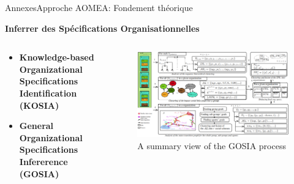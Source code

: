 \begin{frame}[allowframebreaks]{Annexes}{Approche AOMEA: Fondement théorique}

    \textbf{Inferrer des Spécifications Organisationnelles}

    \begin{columns}

        \begin{column}{0.3\textwidth}

            \begin{itemize}
                \item \textbf{Knowledge-based Organizational Specifications Identification (KOSIA)}
                \item \textbf{General Organizational Specifications Infererence (GOSIA)}
            \end{itemize}

        \end{column}

        \begin{column}{0.8\textwidth}
            \begin{figure}
                \centering
                \includegraphics[width=0.95\linewidth]{figures/GOSIA_view.png}
                \caption*{A summary view of the GOSIA process}
                \label{fig:gosia_process}
            \end{figure}
        \end{column}

    \end{columns}

\end{frame}
